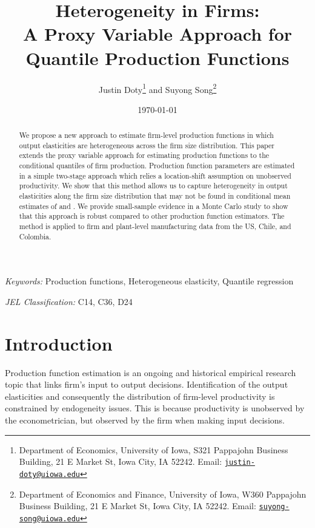 \documentclass[11pt]{article}
\begin{document}
\title{Heterogeneity in Firms: \\
A Proxy Variable Approach for Quantile Production Functions
}

\author{Justin Doty\thanks{Department of Economics, University of Iowa, S321 Pappajohn Business Building, 21 E Market St, Iowa City, IA 52242. Email: \href{mailto:justin-doty@uiowa.edu}{\texttt{justin-doty@uiowa.edu}}} and Suyong Song\thanks{Department of Economics and Finance, University of Iowa, W360 Pappajohn Business Building, 21 E Market St, Iowa City, IA 52242. Email: \href{mailto:suyong-song@uiowa.edu}{\texttt{suyong-song@uiowa.edu}}}
}

\date {\today}
\maketitle


\begin{abstract}
We propose a new approach to estimate firm-level production functions in which output elasticities are heterogeneous across the firm size distribution. 
This paper extends the proxy variable approach for estimating production functions to the conditional quantiles of firm production. Production function parameters are estimated in a simple two-stage approach which relies a location-shift assumption on unobserved productivity. We show that this method allows us to capture heterogeneity in output elasticities along the firm size distribution that may not be found in conditional mean estimates of \cite{Olley1996} and \cite{Levinsohn2003}. We provide small-sample evidence in a Monte Carlo study to show that this approach is robust compared to other production function estimators. The method is applied to firm and plant-level manufacturing data from the US, Chile, and Colombia.
\end{abstract}


\textit{Keywords:} Production functions, Heterogeneous elasticity, Quantile regression

\textit{JEL Classification:} C14, C36, D24



\baselineskip25pt

\onehalfspacing

\section{Introduction}

Production function estimation is an ongoing and historical empirical research topic that links firm's input to output decisions. Identification of the output elasticities and consequently the distribution of firm-level productivity is constrained by endogeneity issues. This is because productivity is unobserved by the econometrician, but observed by the firm when making input decisions. 
\end{document}
